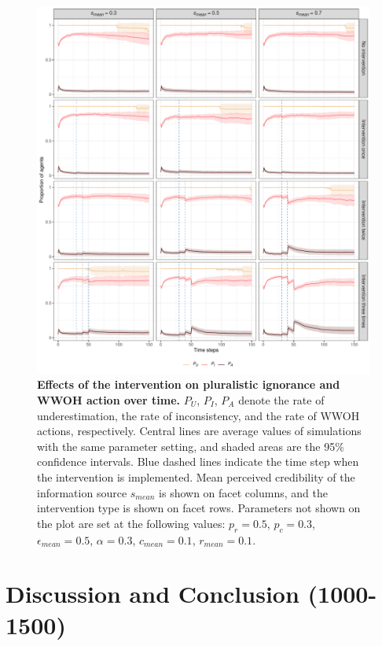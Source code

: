 \documentclass[
  11pt,
]{article}
\begin{document}
\begin{figure}[h]
  \centering
  \includegraphics[width=1\columnwidth]{./figures/intervention_process.pdf}
  \caption{\textbf{Effects of the intervention on pluralistic ignorance and WWOH action over time.} $P_U$, $P_I$, $P_A$ denote the rate of underestimation, the rate of inconsistency, and the rate of WWOH actions, respectively. Central lines are average values of simulations with the same parameter setting, and shaded areas are the 95\% confidence intervals. Blue dashed lines indicate the time step when the intervention is implemented. Mean perceived credibility of the information source $s_{mean}$ is shown on facet columns, and the intervention type is shown on facet rows. Parameters not shown on the plot are set at the following values: $p_r = 0.5$, $p_c = 0.3$, $\epsilon_{mean} = 0.5$, $\alpha = 0.3$, $c_{mean} = 0.1$, $r_{mean} = 0.1$.}
  \label{fig:5}
\end{figure}

\hypertarget{discussion-and-conclusion-1000-1500}{%
\section{Discussion and Conclusion
(1000-1500)}\label{discussion-and-conclusion-1000-1500}}
\end{document}
